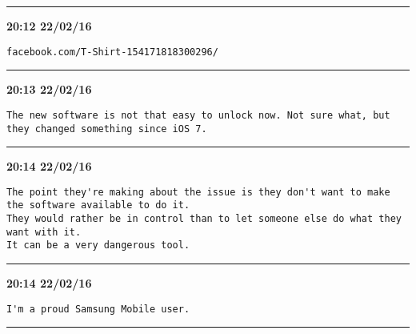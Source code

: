 \hrule%

\begin{adjustwidth}{0cm}{0cm}
\footnotesize \textbf{20:12 22/02/16}

\begin{lstlisting}[breaklines, breakatwhitespace, basicstyle=\small, frame=leftline]
facebook.com/T-Shirt-154171818300296/
\end{lstlisting}
\end{adjustwidth}

\hrule%

\begin{adjustwidth}{0cm}{0cm}
\footnotesize \textbf{20:13 22/02/16}

\begin{lstlisting}[breaklines, breakatwhitespace, basicstyle=\small, frame=leftline]
The new software is not that easy to unlock now. Not sure what, but they changed something since iOS 7.
\end{lstlisting}
\end{adjustwidth}

\hrule%

\begin{adjustwidth}{0cm}{0cm}
\footnotesize \textbf{20:14 22/02/16}

\begin{lstlisting}[breaklines, breakatwhitespace, basicstyle=\small, frame=leftline]
The point they're making about the issue is they don't want to make the software available to do it.
They would rather be in control than to let someone else do what they want with it.
It can be a very dangerous tool.
\end{lstlisting}
\end{adjustwidth}

\hrule%

\begin{adjustwidth}{0cm}{0cm}
\footnotesize \textbf{20:14 22/02/16}

\begin{lstlisting}[breaklines, breakatwhitespace, basicstyle=\small, frame=leftline]
I'm a proud Samsung Mobile user.
\end{lstlisting}
\end{adjustwidth}

\hrule%


